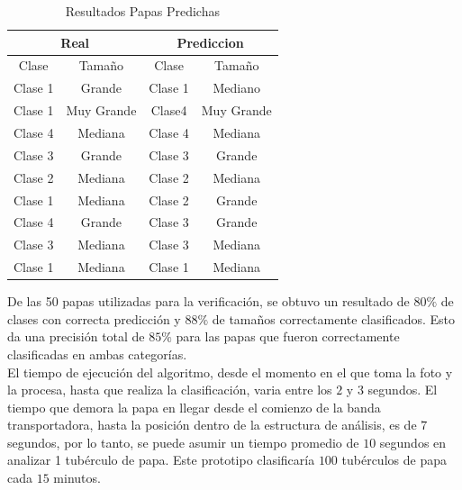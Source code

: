 \begin{table}[ht]
	\centering
	\begin{tabular}{|cc|cc|}
		\hline
		\multicolumn{2}{|c|}{Real}                 & \multicolumn{2}{c|}{Prediccion}           \\ \hline
		\multicolumn{1}{|c|}{Clase}   & Tamaño     & \multicolumn{1}{c|}{Clase}   & Tamaño     \\ \hline
		\multicolumn{1}{|c|}{Clase 1} & Grande     & \multicolumn{1}{c|}{Clase 1} & Mediano    \\ \hline
		\multicolumn{1}{|c|}{Clase 1} & Muy Grande & \multicolumn{1}{c|}{Clase4}  & Muy Grande \\ \hline
		\multicolumn{1}{|c|}{Clase 4} & Mediana    & \multicolumn{1}{c|}{Clase 4} & Mediana    \\ \hline
		\multicolumn{1}{|c|}{Clase 3} & Grande     & \multicolumn{1}{c|}{Clase 3} & Grande     \\ \hline
		\multicolumn{1}{|c|}{Clase 2} & Mediana    & \multicolumn{1}{c|}{Clase 2} & Mediana    \\ \hline
		\multicolumn{1}{|c|}{Clase 1} & Mediana    & \multicolumn{1}{c|}{Clase 2} & Grande     \\ \hline
		\multicolumn{1}{|c|}{Clase 4} & Grande     & \multicolumn{1}{c|}{Clase 3} & Grande     \\ \hline
		\multicolumn{1}{|c|}{Clase 3} & Mediana    & \multicolumn{1}{c|}{Clase 3} & Mediana    \\ \hline
		\multicolumn{1}{|c|}{Clase 1} & Mediana    & \multicolumn{1}{c|}{Clase 1} & Mediana    \\ \hline
	\end{tabular}
	\caption{Resultados Papas Predichas}
	\label{table:res}
\end{table}


De las 50 papas utilizadas para la verificación, se obtuvo un resultado de $80\%$ de clases con correcta predicción y $88\%$ de tamaños correctamente clasificados. Esto da una precisión total de $85\%$ para las papas que fueron correctamente clasificadas en ambas categorías.\\

El tiempo de ejecución del algoritmo, desde el momento en el que toma la foto y la procesa, hasta que realiza la clasificación, varia entre los $2$ y $3$ segundos. El tiempo que demora la papa en llegar desde el comienzo de la banda transportadora, hasta la posición dentro de la estructura de análisis, es de $7$ segundos, por lo tanto, se puede asumir un tiempo promedio de $10$ segundos en analizar 1 tubérculo de papa. Este prototipo clasificaría $100$ tubérculos de papa cada $15$ minutos.	 	

